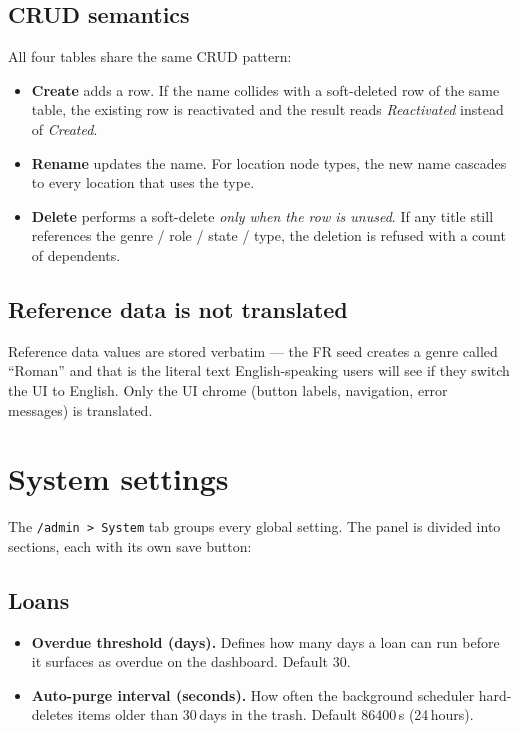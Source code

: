\subsection*{CRUD semantics}

All four tables share the same CRUD pattern:

\begin{itemize}
  \item \textbf{Create} adds a row. If the name collides with a
        soft-deleted row of the same table, the existing row is
        reactivated and the result reads \emph{Reactivated} instead
        of \emph{Created}.
  \item \textbf{Rename} updates the name. For location node types,
        the new name cascades to every location that uses the
        type.
  \item \textbf{Delete} performs a soft-delete \emph{only when the
        row is unused}. If any title still references the
        genre / role / state / type, the deletion is refused with
        a count of dependents.
\end{itemize}

\subsection*{Reference data is not translated}

Reference data values are stored verbatim — the FR seed creates a
genre called ``Roman'' and that is the literal text English-speaking
users will see if they switch the UI to English. Only the UI
chrome (button labels, navigation, error messages) is
translated.

\section{System settings}\label{sec:system}

The \texttt{/admin > System} tab groups every global setting. The
panel is divided into sections, each with its own save button:

\subsection*{Loans}

\begin{itemize}
  \item \textbf{Overdue threshold (days).} Defines how many days a
        loan can run before it surfaces as overdue on the dashboard.
        Default 30.
  \item \textbf{Auto-purge interval (seconds).} How often the
        background scheduler hard-deletes items older than 30\,days
        in the trash. Default 86400\,s (24\,hours).
\end{itemize}

